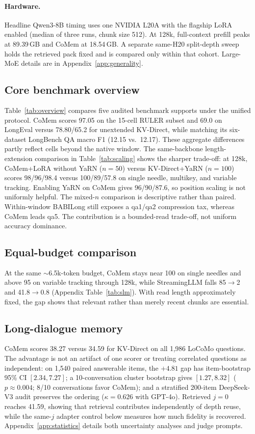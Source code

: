 \paragraph{Hardware.} Headline Qwen3-8B timing uses one NVIDIA L20A with the
flagship LoRA enabled (median of three runs, chunk size 512). At 128k,
full-context prefill peaks at 89.39\,GB and CoMem at 18.54\,GB. A separate
same-H20 split-depth sweep holds the retrieved pack fixed and is compared only
within that cohort. Large-MoE details are in Appendix~\ref{app:generality}.



\subsection{Core benchmark overview}
Table~\ref{tab:overview} compares five audited benchmark supports under the
unified protocol. CoMem scores 97.05 on the 15-cell RULER subset and 69.0 on
LongEval versus 78.80/65.2 for unextended KV-Direct, while matching its
six-dataset LongBench QA macro F1 (12.15 vs.\ 12.17). These aggregate differences
partly reflect cells beyond the native window. The same-backbone length-extension comparison in Table~\ref{tab:scaling} shows
the sharper trade-off: at 128k, CoMem+LoRA without YaRN ($n{=}50$) versus
KV-Direct+YaRN ($n{=}100$) scores 98/96/98.4 versus 100/89/57.8 on single
needle, multikey, and variable tracking. Enabling YaRN on CoMem gives
96/90/87.6, so position scaling is not uniformly helpful. The mixed-$n$
comparison is descriptive rather than paired. Within-window BABILong still
exposes a qa1/qa2 compression tax, whereas CoMem leads qa5. The contribution is
a bounded-read trade-off, not uniform accuracy dominance.

\subsection{Equal-budget comparison}
At the same $\sim$6.5k-token budget, CoMem stays near 100 on single needles and
above 95 on variable tracking through 128k, while StreamingLLM falls
85$\to$2 and 41.8$\to$0.8 (Appendix Table~\ref{tab:slm}). With read length
approximately fixed, the gap shows that relevant rather than merely recent
chunks are essential.

\subsection{Long-dialogue memory}

CoMem scores 38.27 versus 34.59 for KV-Direct on all 1,986 LoCoMo questions.
The advantage is not an artifact of one scorer or treating correlated questions
as independent: on 1,540 paired answerable items, the $+4.81$ gap has
item-bootstrap 95\% CI $[2.34,7.27]$; a 10-conversation cluster bootstrap gives
$[1.27,8.32]$ ($p{\approx}0.004$; 8/10 conversations favor CoMem); and a
stratified 200-item DeepSeek-V3 audit preserves the ordering
($\kappa=0.626$ with GPT-4o). Retrieved $j=0$
reaches 41.59, showing that retrieval contributes independently of depth reuse,
while the same-$j$ adapter control below measures how much fidelity is recovered.
Appendix~\ref{app:statistics} details both uncertainty analyses and judge prompts.

